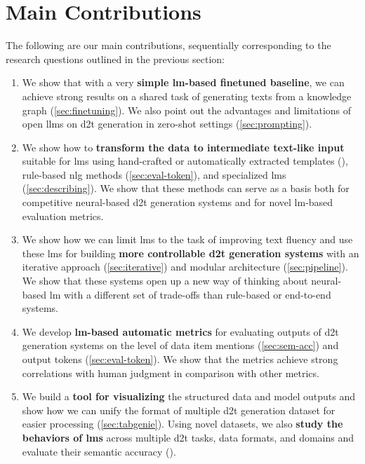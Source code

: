 \section{Main Contributions}
\label{sec:contributions}


The following are our main contributions, sequentially corresponding to the research questions outlined in the previous section:
\begin{enumerate}
    \item We show that with a very \textbf{simple \ac{lm}-based finetuned baseline}, we can achieve strong results on a shared task of generating texts from a knowledge graph (\autoref{sec:finetuning}). We also point out the advantages and limitations of open \acp{llm} on \ac{d2t} generation in zero-shot settings (\autoref{sec:prompting}).
    \item We show how to \textbf{transform the data to intermediate text-like input} suitable for \acp{lm} using hand-crafted or automatically extracted templates (), rule-based \ac{nlg} methods (\autoref{sec:eval-token}), and specialized \acp{lm} (\autoref{sec:describing}). We show that these methods can serve as a basis both for competitive neural-based \ac{d2t} generation systems and for novel \ac{lm}-based evaluation metrics.
    \item We show how we can limit \acp{lm} to the task of improving text fluency and use these \acp{lm} for building \textbf{more controllable \ac{d2t} generation systems} with an iterative approach (\autoref{sec:iterative}) and modular architecture (\autoref{sec:pipeline}). We show that these systems open up a new way of thinking about neural-based \ac{lm} with a different set of trade-offs than rule-based or end-to-end systems.
    \item We develop \textbf{\ac{lm}-based automatic metrics} for evaluating outputs of \ac{d2t} generation systems on the level of data item mentions (\autoref{sec:sem-acc}) and output tokens (\autoref{sec:eval-token}). We show that the metrics achieve strong correlations with human judgment in comparison with other metrics.
    \item We build a \textbf{tool for visualizing} the structured data and model outputs and show how we can unify the format of multiple \ac{d2t} generation dataset for easier processing (\autoref{sec:tabgenie}). Using novel datasets, we also \textbf{study the behaviors of \acp{lm}} across multiple \ac{d2t} tasks, data formats, and domains and evaluate their semantic accuracy ().
\end{enumerate}



